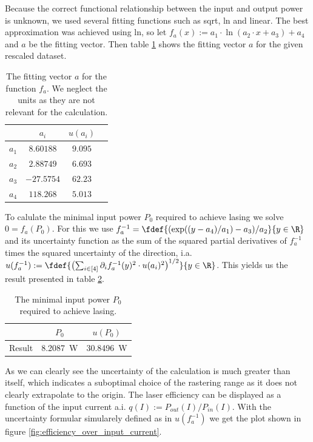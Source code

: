 \documentclass[../main.tex]{subfiles}
\begin{document}
    Because the correct functional relationship between the input and output power is unknown, we used several fitting functions such as sqrt, ln and linear. The best approximation was achieved using ln, so let $f_a(x) := a_1\cdot \ln(a_2\cdot x + a_3) + a_4$ and $a$ be the fitting vector. Then table \ref{tab:fitting_vector_logfit} shows the fitting vector $a$ for the given rescaled dataset. 
    \begin{table}[H]
        \centering
        \begin{tabular}{|c|c|c|c}
            \hline
             & $a_i$ & $u(a_i)$ \\
            \hline\hline
            $a_1$ & $8.60188$ & $9.095$ \\
            $a_2$ & $2.88749$ & $6.693$ \\
            $a_3$ & $-27.5754$ & $62.23$ \\
            $a_4$ & $118.268$ & $5.013$ \\
            \hline
        \end{tabular}
        \caption{The fitting vector $a$ for the function $f_a$. We neglect the units as they are not relevant for the calculation.}
        \label{tab:fitting_vector_logfit}
    \end{table}
    To calulate the minimal input power $P_0$ required to achieve lasing we solve $0 = f_a(P_0)$. For this we use $f_a^{-1}=\fdef{(\exp((y-a_4)/a_1)-a_3)/a_2}{y\in\R}$ and its uncertainty function as the sum of the squared partial derivatives of $f_a^{-1}$ times the squared uncertainty of the direction, i.a. $u(f_a^{-1}):=\fdef{\bbra{\sum_{i\in[4]}\partial_if_a^{-1}(y)^2\cdot u(a_i)^2}^{1/2}}{y\in\R}$. This yields us the result presented in table \ref{tab:minimal_input_power}. 
    \begin{table}[H]
        \centering
        \begin{tabular}{|c|cc|}
            \hline
            & $P_0$ & $u(P_0)$ \\
            \hline\hline
            Result & \SI{8.2087}{\W} & \SI{30.8496}{\W} \\
            \hline
        \end{tabular}
        \caption{The minimal input power $P_0$ required to achieve lasing.}
        \label{tab:minimal_input_power}
    \end{table}
    As we can clearly see the uncertainty of the calculation is much greater than itself, which indicates a suboptimal choice of the rastering range as it does not clearly extrapolate to the origin. The laser efficiency can be displayed as a function of the input current a.i. $q(I) := P_{\textit{out}}(I)/P_{\textit{in}}(I)$. With the uncertainty formular simularely defined as in $u(f_a^{-1})$ we get the plot shown in figure \ref{fig:efficiency_over_input_current}. 
\end{document}

